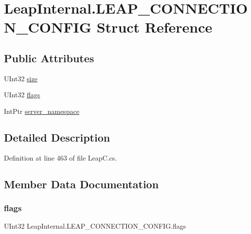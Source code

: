\hypertarget{struct_leap_internal_1_1_l_e_a_p___c_o_n_n_e_c_t_i_o_n___c_o_n_f_i_g}{}\section{Leap\+Internal.\+L\+E\+A\+P\+\_\+\+C\+O\+N\+N\+E\+C\+T\+I\+O\+N\+\_\+\+C\+O\+N\+F\+IG Struct Reference}
\label{struct_leap_internal_1_1_l_e_a_p___c_o_n_n_e_c_t_i_o_n___c_o_n_f_i_g}
\subsection*{Public Attributes}
\begin{DoxyCompactItemize}
\item 
U\+Int32 \mbox{\hyperlink{struct_leap_internal_1_1_l_e_a_p___c_o_n_n_e_c_t_i_o_n___c_o_n_f_i_g_a4746dd9bc79ad1934f2801e68e38d9d1}{size}}
\item 
U\+Int32 \mbox{\hyperlink{struct_leap_internal_1_1_l_e_a_p___c_o_n_n_e_c_t_i_o_n___c_o_n_f_i_g_a70b836de05823b343ec5df4e6751ba8d}{flags}}
\item 
Int\+Ptr \mbox{\hyperlink{struct_leap_internal_1_1_l_e_a_p___c_o_n_n_e_c_t_i_o_n___c_o_n_f_i_g_a1bf89a95e26e6ddc466744ce0661a18a}{server\+\_\+namespace}}
\end{DoxyCompactItemize}


\subsection{Detailed Description}


Definition at line 463 of file Leap\+C.\+cs.



\subsection{Member Data Documentation}
\mbox{\label{struct_leap_internal_1_1_l_e_a_p___c_o_n_n_e_c_t_i_o_n___c_o_n_f_i_g_a70b836de05823b343ec5df4e6751ba8d}} 
\subsubsection{\texorpdfstring{flags}{flags}}
{\footnotesize\ttfamily U\+Int32 Leap\+Internal.\+L\+E\+A\+P\+\_\+\+C\+O\+N\+N\+E\+C\+T\+I\+O\+N\+\_\+\+C\+O\+N\+F\+I\+G.\+flags}



